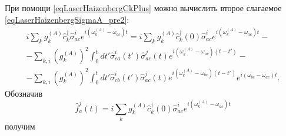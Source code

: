 При помощи \eqref{eqLaserHaizenbergCkPlus} можно вычислить второе
слагаемое \eqref{eqLaserHaizenbergSigmaA_pre2}:
\begin{eqnarray}
i
\sum_{k}
g_k^{(A)}
\hat{c}_k^{\dag}\hat{\sigma}^{i}_{ac}  
e^{i\left(\omega_k^{(A)} - \omega_{ac}\right)t} = 
i
\sum_{k}
g_k^{(A)}
\hat{c}_k^{\dag}\left(0\right)\hat{\sigma}^{i}_{ac}  
e^{i\left(\omega_k^{(A)} - \omega_{ac}\right)t} -
\nonumber \\
-
\sum_{k,i} 
\left(g_{k}^{(A)}\right)^2
\int_0^t d t'
\hat{\sigma}_{ca}^{i}\left(t'\right)\hat{\sigma}^{j}_{ac}\left(t\right) 
e^{i\left(\omega_{k}^{(A)} - \omega_{ac}\right)\left(t-t'\right)}
-
\nonumber \\
-
\sum_{k,i} 
\left(g_{k}^{(A)}\right)^2
\int_0^t d t'
\hat{\sigma}_{cb}^{i}\left(t'\right)\hat{\sigma}^{j}_{ac}\left(t\right) 
e^{i\left(\omega_{k}^{(A)} - \omega_{bc}\right)\left(t-t'\right)}
e^{i\left(\omega_{bc} - \omega_{ac}\right)t}.
\nonumber
\end{eqnarray}
Обозначив
\begin{equation}
\hat{f}_{a}^{j}\left(t\right) = i
\sum_{k}
g_k^{(A)}
\hat{c}_k^{\dag}\left(0\right)\hat{\sigma}^{i}_{ac}  
e^{i\left(\omega_k^{(A)} - \omega_{ac}\right)t}
\label{eqLaserHaizenbergFAJ}
\end{equation}
получим
